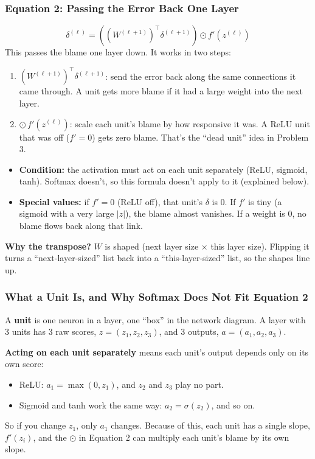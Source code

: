 \subsubsection*{Equation 2: Passing the Error Back One Layer}
\[
\delta^{(\ell)} = \left( \left(W^{(\ell+1)}\right)^{\top} \delta^{(\ell+1)} \right) \odot f'(z^{(\ell)})
\]
This passes the blame one layer down. It works in two steps:
\begin{enumerate}[leftmargin=*]
  \item $\left(W^{(\ell+1)}\right)^{\top} \delta^{(\ell+1)}$: send the error back along the same connections it came through. A unit gets more blame if it had a large weight into the next layer.
  \item $\odot\, f'(z^{(\ell)})$: scale each unit's blame by how responsive it was. A ReLU unit that was off ($f'=0$) gets zero blame. That's the ``dead unit'' idea in Problem 3.
\end{enumerate}
\begin{itemize}[leftmargin=*]
  \item \textbf{Condition:} the activation must act on each unit separately (ReLU, sigmoid, tanh). Softmax doesn't, so this formula doesn't apply to it (explained below).
  \item \textbf{Special values:} if $f'=0$ (ReLU off), that unit's $\delta$ is 0. If $f'$ is tiny (a sigmoid with a very large $|z|$), the blame almost vanishes. If a weight is 0, no blame flows back along that link.
\end{itemize}

\textbf{Why the transpose?} $W$ is shaped (next layer size $\times$ this layer size). Flipping it turns a ``next-layer-sized'' list back into a ``this-layer-sized'' list, so the shapes line up.

\subsubsection*{What a Unit Is, and Why Softmax Does Not Fit Equation 2}

A \textbf{unit} is one neuron in a layer, one ``box'' in the network diagram. A layer with 3 units has 3 raw scores, $z=(z_1,z_2,z_3)$, and 3 outputs, $a=(a_1,a_2,a_3)$.

\textbf{Acting on each unit separately} means each unit's output depends only on its own score:
\begin{itemize}[leftmargin=*]
  \item ReLU: $a_1 = \max(0, z_1)$, and $z_2$ and $z_3$ play no part.
  \item Sigmoid and tanh work the same way: $a_2 = \sigma(z_2)$, and so on.
\end{itemize}
So if you change $z_1$, only $a_1$ changes. Because of this, each unit has a single slope, $f'(z_i)$, and the $\odot$ in Equation 2 can multiply each unit's blame by its own slope.

